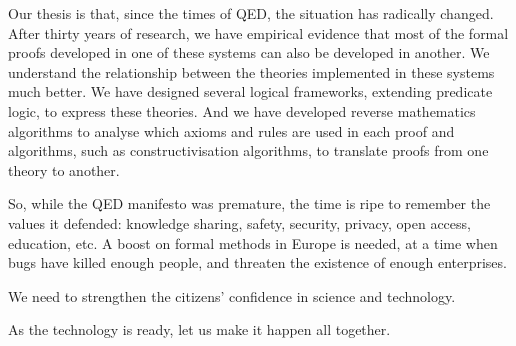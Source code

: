 Our thesis is that, since the times of QED, the situation has radically
changed. After thirty years of research, we have empirical evidence
that most of the formal proofs developed in one of these systems can
also be developed in another. We understand the relationship between
the theories implemented in these systems much better. We have
designed several logical frameworks, extending predicate logic, to express
these theories. And we have developed reverse
mathematics algorithms to analyse which axioms and rules are used in
each proof and algorithms, such as constructivisation algorithms, to
translate proofs from one theory to another.

So, while the QED manifesto was premature, the time is ripe to
remember the values it defended: knowledge sharing, safety, security,
privacy, open access, education, etc. A boost on formal methods in
Europe is needed, at a time when bugs have killed enough people, and
threaten the existence of enough enterprises.

We need to strengthen the citizens' confidence in science and technology.

As the technology is ready, let us make it happen all together.


